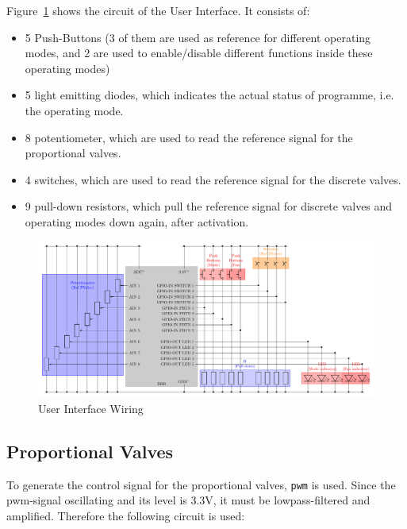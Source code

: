 \documentclass[
	fontsize=10pt
	paper=a4
]{scrartcl}
\begin{document}
Figure~\ref{fig:hui_circuit} shows the circuit of the User Interface. 
It consists of:
\begin{itemize}
	\item 5 Push-Buttons (3 of them are used as reference for different operating modes, and 2 are used to enable/disable different functions inside these operating modes)
	\item 5 light emitting diodes, which indicates the actual status of programme, i.e. the operating mode.
	\item 8 potentiometer, which are used to read the reference signal for the proportional valves.
	\item 4 switches, which are used to read the reference signal for the discrete valves.
	\item 9 pull-down resistors, which pull the reference signal for discrete valves and operating modes down again, after activation.
\end{itemize}

\begin{figure}[h!]
\begin{center}
\includegraphics[width=.98\textwidth]{Images/circuit_HUI/circuit_HUI.pdf}
\caption{User Interface Wiring}
\label{fig:hui_circuit}
\end{center}
\end{figure}


\subsection{Proportional Valves}

To generate the control signal for the proportional valves, \texttt{pwm} is used.
Since the pwm-signal oscillating and its level is 3.3V, it must be lowpass-filtered and amplified.
Therefore the following circuit is used:
\end{document}
